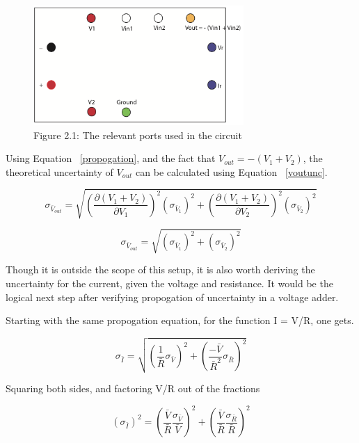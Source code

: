 \documentclass[journal]{IEEEtran}
\begin{document}
\begin{figure}[ht!]
\centering
\includegraphics[width=80mm]{circuit.png}
\caption{Figure 2.1: The relevant ports used in the circuit}
\end{figure}

Using Equation ~\ref{propogation}, and the fact that $V_{out} = -(V_1 + V_2)$,
the theoretical uncertainty of $V_{out}$ can be calculated using Equation
~\ref{voutunc}.

\begin{displaymath}
\sigma _{\bar V_{out}} = \sqrt{ \left( \frac{\partial (V_1 + V_2)}{\partial V_1}
\right)^2 \left( \sigma _{\bar V_1} \right)^2 + \left( \frac{\partial (V_1 +
V_2)}{\partial V_2} \right)^2 \left( \sigma _{\bar V_2}\right)^2}
\end{displaymath}

\begin{equation}
\label{voutunc}
\sigma _{\bar V_{out}} = \sqrt{ \left( \sigma _{\bar V_1} \right)^2 + \left(
\sigma _{\bar V_2}\right)^2}
\end{equation}

Though it is outside the scope of this setup, it is also worth deriving the
uncertainty for the current, given the voltage and resistance. It would be the
logical next step after verifying propogation of uncertainty in a voltage
adder.

Starting with the same propogation equation, for the function I = V/R, one gets.

\begin{displaymath}
\sigma _{\bar I} = \sqrt{ \left(\frac{1}{\bar R} \sigma _{\bar V} \right)^2 + 
\left( \frac{- \bar V}{\bar R^2} \sigma _{\bar R} \right)^2 }
\end{displaymath}

Squaring both sides, and factoring V/R out of the fractions

\begin{displaymath}
\left( \sigma _{\bar I} \right)^2 = \left( \frac{\bar V}{\bar R} \frac{\sigma
_{\bar V}}{\bar V} \right)^2 + \left( \frac{\bar V}{\bar R} \frac{\sigma _{\bar
R}}{\bar R} \right)^2
\end{displaymath}
\end{document}
